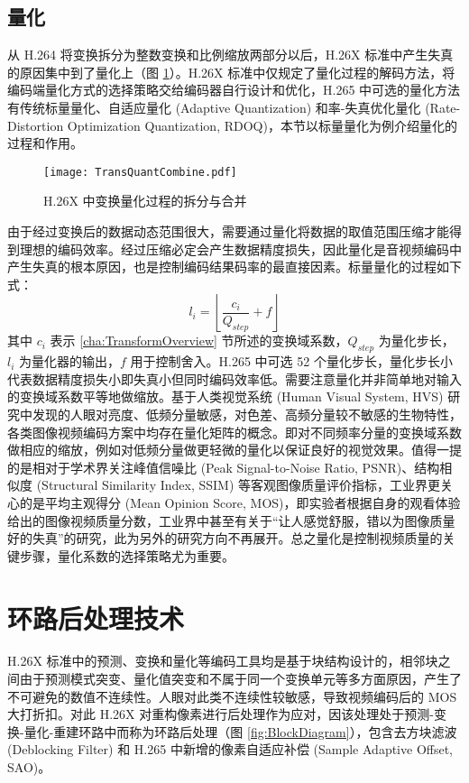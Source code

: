 \subsection{量化}
从 H.264 将变换拆分为整数变换和比例缩放两部分以后，H.26X 标准中产生失真的原因集中到了量化上（图 \ref{fig:TransQuantCombine}）。H.26X 标准中仅规定了量化过程的解码方法，将编码端量化方式的选择策略交给编码器自行设计和优化，H.265 中可选的量化方法有传统标量量化、自适应量化 (Adaptive Quantization) 和率-失真优化量化 (Rate-Distortion Optimization Quantization, RDOQ)，本节以标量量化为例介绍量化的过程和作用。
\begin{figure}[htb]
    \centering
    \texttt{[image: TransQuantCombine.pdf]}
    \caption{H.26X 中变换量化过程的拆分与合并}
    \label{fig:TransQuantCombine}
\end{figure}

由于经过变换后的数据动态范围很大，需要通过量化将数据的取值范围压缩才能得到理想的编码效率。经过压缩必定会产生数据精度损失，因此量化是音视频编码中产生失真的根本原因，也是控制编码结果码率的最直接因素。标量量化的过程如下式：
\begin{equation}
    l_i=\left\lfloor \frac{c_i}{Q_{step}}+f \right\rfloor
\end{equation}
其中 $c_i$ 表示 \ref{cha:TransformOverview} 节所述的变换域系数，$Q_{step}$ 为量化步长，$l_i$ 为量化器的输出，$f$ 用于控制舍入。H.265 中可选 52 个量化步长，量化步长小代表数据精度损失小即失真小但同时编码效率低。需要注意量化并非简单地对输入的变换域系数平等地做缩放。基于人类视觉系统 (Human Visual System, HVS) 研究中发现的人眼对亮度、低频分量敏感，对色差、高频分量较不敏感的生物特性，各类图像视频编码方案中均存在量化矩阵的概念。即对不同频率分量的变换域系数做相应的缩放，例如对低频分量做更轻微的量化以保证良好的视觉效果。值得一提的是相对于学术界关注峰值信噪比 (Peak Signal-to-Noise Ratio, PSNR)、结构相似度 (Structural Similarity Index, SSIM) 等客观图像质量评价指标，工业界更关心的是平均主观得分 (Mean Opinion Score, MOS)，即实验者根据自身的观看体验给出的图像视频质量分数，工业界中甚至有关于“让人感觉舒服，错以为图像质量好的失真”的研究，此为另外的研究方向不再展开。总之量化是控制视频质量的关键步骤，量化系数的选择策略尤为重要。

\section{环路后处理技术}
H.26X 标准中的预测、变换和量化等编码工具均是基于块结构设计的，相邻块之间由于预测模式突变、量化值突变和不属于同一个变换单元等多方面原因，产生了不可避免的数值不连续性。人眼对此类不连续性较敏感，导致视频编码后的 MOS 大打折扣。对此 H.26X 对重构像素进行后处理作为应对，因该处理处于预测-变换-量化-重建环路中而称为环路后处理（图 \ref{fig:BlockDiagram}），包含去方块滤波 (Deblocking Filter) 和 H.265 中新增的像素自适应补偿 (Sample Adaptive Offset, SAO)。
